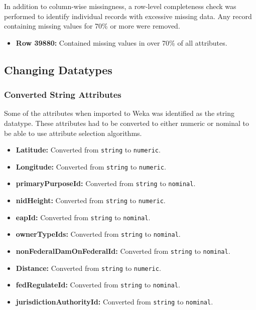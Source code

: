 \documentclass{article}
\begin{document}
In addition to column-wise missingness, a row-level completeness check was performed to identify individual records with excessive missing data. Any record containing missing values for 70\% or more were removed. 

\begin{itemize}
    \item \textbf{Row 39880:} Contained missing values in over 70\% of all attributes.
\end{itemize}

\subsection{Changing Datatypes}

\subsubsection{Converted String Attributes}

Some of the attributes when imported to Weka was identified as the string datatype. These attributes had to be converted to either numeric or nominal to be able to use attribute selection algorithms. 

\begin{itemize}
    \item \textbf{Latitude:} Converted from \texttt{string} to \texttt{numeric}.
    \item \textbf{Longitude:} Converted from \texttt{string} to \texttt{numeric}.
    \item \textbf{primaryPurposeId:} Converted from \texttt{string} to \texttt{nominal}.
    \item \textbf{nidHeight:} Converted from \texttt{string} to \texttt{numeric}.
    \item \textbf{eapId:} Converted from \texttt{string} to \texttt{nominal}.
    \item \textbf{ownerTypeIds:} Converted from \texttt{string} to \texttt{nominal}.
    \item \textbf{nonFederalDamOnFederalId:} Converted from \texttt{string} to \texttt{nominal}.
    \item \textbf{Distance:} Converted from \texttt{string} to \texttt{numeric}.
    \item \textbf{fedRegulateId:} Converted from \texttt{string} to \texttt{nominal}.
    \item \textbf{jurisdictionAuthorityId:} Converted from \texttt{string} to \texttt{nominal}.
\end{itemize}
\end{document}
